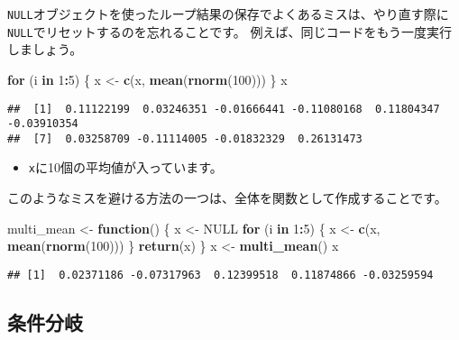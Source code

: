 \documentclass[]{bxjsarticle}
\newenvironment{Shaded}{\begin{snugshade}}{\end{snugshade}}
\newcommand{\ControlFlowTok}[1]{\textcolor[rgb]{0.13,0.29,0.53}{\textbf{#1}}}
\newcommand{\DecValTok}[1]{\textcolor[rgb]{0.00,0.00,0.81}{#1}}
\newcommand{\KeywordTok}[1]{\textcolor[rgb]{0.13,0.29,0.53}{\textbf{#1}}}
\newcommand{\NormalTok}[1]{#1}
\newcommand{\OperatorTok}[1]{\textcolor[rgb]{0.81,0.36,0.00}{\textbf{#1}}}
\newcommand{\OtherTok}[1]{\textcolor[rgb]{0.56,0.35,0.01}{#1}}
\newcommand{\StringTok}[1]{\textcolor[rgb]{0.31,0.60,0.02}{#1}}
\providecommand{\tightlist}{%
  \setlength{\itemsep}{0pt}\setlength{\parskip}{0pt}}
\begin{document}
\texttt{NULL}オブジェクトを使ったループ結果の保存でよくあるミスは、やり直す際に\texttt{NULL}でリセットするのを忘れることです。
例えば、同じコードをもう一度実行しましょう。

\begin{Shaded}
\begin{Highlighting}[]
\ControlFlowTok{for}\NormalTok{ (i }\ControlFlowTok{in} \DecValTok{1}\OperatorTok{:}\DecValTok{5}\NormalTok{) \{}
\NormalTok{  x <-}\StringTok{ }\KeywordTok{c}\NormalTok{(x, }\KeywordTok{mean}\NormalTok{(}\KeywordTok{rnorm}\NormalTok{(}\DecValTok{100}\NormalTok{)))}
\NormalTok{\}}
\NormalTok{x}
\end{Highlighting}
\end{Shaded}

\begin{verbatim}
##  [1]  0.11122199  0.03246351 -0.01666441 -0.11080168  0.11804347 -0.03910354
##  [7]  0.03258709 -0.11114005 -0.01832329  0.26131473
\end{verbatim}

\begin{itemize}
\tightlist
\item
  \texttt{x}に10個の平均値が入っています。
\end{itemize}

このようなミスを避ける方法の一つは、全体を関数として作成することです。

\begin{Shaded}
\begin{Highlighting}[]
\NormalTok{multi_mean <-}\StringTok{ }\ControlFlowTok{function}\NormalTok{() \{}
\NormalTok{  x <-}\StringTok{ }\OtherTok{NULL}
  \ControlFlowTok{for}\NormalTok{ (i }\ControlFlowTok{in} \DecValTok{1}\OperatorTok{:}\DecValTok{5}\NormalTok{) \{}
\NormalTok{    x <-}\StringTok{ }\KeywordTok{c}\NormalTok{(x, }\KeywordTok{mean}\NormalTok{(}\KeywordTok{rnorm}\NormalTok{(}\DecValTok{100}\NormalTok{)))}
\NormalTok{  \}}
  \KeywordTok{return}\NormalTok{(x)}
\NormalTok{\}}
\NormalTok{x <-}\StringTok{ }\KeywordTok{multi_mean}\NormalTok{()}
\NormalTok{x}
\end{Highlighting}
\end{Shaded}

\begin{verbatim}
## [1]  0.02371186 -0.07317963  0.12399518  0.11874866 -0.03259594
\end{verbatim}

\hypertarget{ux6761ux4ef6ux5206ux5c90}{%
\subsection{条件分岐}\label{ux6761ux4ef6ux5206ux5c90}}
\end{document}
